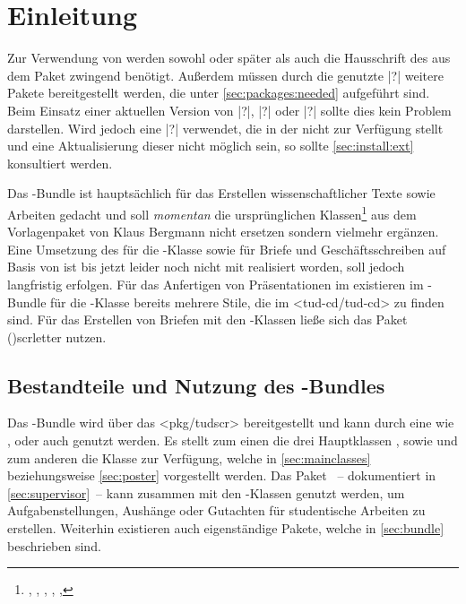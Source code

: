 \chapter{Einleitung}

Zur Verwendung von \vTUDScript{\TUDScript} werden sowohl 
\vKOMAScript{\KOMAScript} oder später als auch die Hausschrift des 
\CDs \OpenSans aus dem Paket  zwingend benötigt. Außerdem 
müssen durch die genutzte \Distro|?| weitere Pakete bereitgestellt werden, die 
unter \autoref{sec:packages:needed} aufgeführt sind. Beim Einsatz einer 
aktuellen Version von \TeXLive|?|, \MacTeX|?| oder \MiKTeX|?| sollte dies kein 
Problem darstellen. Wird jedoch eine \Distro|?| verwendet, die \TUDScript in 
der  nicht zur Verfügung stellt und eine Aktualisierung 
dieser nicht möglich sein, so sollte \autoref{sec:install:ext} konsultiert 
werden.

Das \TUDScript-Bundle ist hauptsächlich für das Erstellen wissenschaftlicher 
Texte sowie Arbeiten gedacht und soll \emph{momentan} die ursprünglichen 
Klassen\footnote{%
  , , , , 
  , %
} aus dem Vorlagenpaket von Klaus Bergmann nicht ersetzen sondern vielmehr 
ergänzen. Eine Umsetzung des \CDs für die -Klasse sowie für Briefe
und Geschäftsschreiben auf Basis von \KOMAScript ist bis jetzt leider noch nicht 
mit \TUDScript realisiert worden, soll jedoch langfristig erfolgen. 
Für das Anfertigen von Präsentationen im \TUDCD existieren im 
-Bundle für die -Klasse bereits mehrere 
Stile, die im \GitHubRepo<tud-cd/tud-cd> zu finden sind. 
Für das Erstellen von Briefen mit den \TUDScript-Klassen ließe sich das Paket
\Package(){scrletter} nutzen.



\section{Bestandteile und Nutzung des \TUDScript-Bundles}

%
Das \TUDScript-Bundle wird über das \CTAN<pkg/tudscr> bereitgestellt und kann 
durch eine \Distro wie \TeXLive, \MacTeX oder auch \MiKTeX genutzt werden. Es 
stellt zum einen die drei Hauptklassen ,  
sowie  und zum anderen die Klasse  zur 
Verfügung, welche in \autoref{sec:mainclasses} beziehungsweise 
\autoref{sec:poster} vorgestellt werden. Das Paket 
~-- dokumentiert in \autoref{sec:supervisor}~-- kann 
zusammen mit den \TUDScript-Klassen genutzt werden, um Aufgabenstellungen, 
Aushänge oder Gutachten für studentische Arbeiten zu erstellen. Weiterhin 
existieren auch eigenständige Pakete, welche in \autoref{sec:bundle} 
beschrieben sind.

